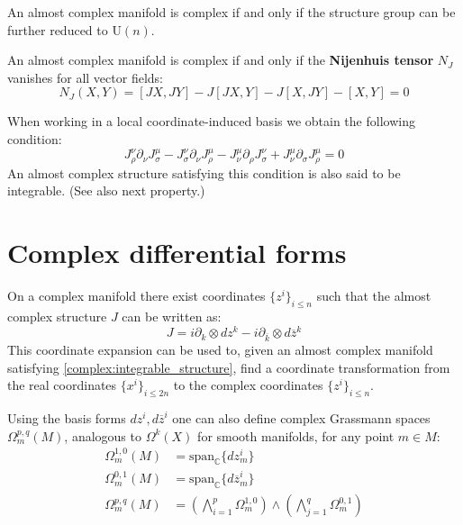 	\begin{property}
		An almost complex manifold is complex if and only if the structure group can be further reduced to U$(n)$.
	\end{property}
	
	\begin{theorem}
		An almost complex manifold is complex if and only if the \textbf{Nijenhuis tensor} $N_J$ vanishes for all vector fields:
		\begin{equation}
			\label{complex:integrable_structure}
			N_J(X, Y) = [JX, JY] - J[JX, Y] - J[X, JY] - [X, Y] = 0
		\end{equation}
	\end{theorem}
	When working in a local coordinate-induced basis we obtain the following condition:
	\begin{equation}
		J_\rho^\nu\partial_\nu J_\sigma^\mu - J_\sigma^\nu\partial_\nu J_\rho^\mu - J_\nu^\mu\partial_\rho J_\sigma^\nu + J_\nu^\mu\partial_\sigma J_\rho^\mu = 0
	\end{equation}
	An almost complex structure satisfying this condition is also said to be integrable. (See also next property.)
	
\section{Complex differential forms}
	
	\begin{property}
		On a complex manifold there exist coordinates $\{z^i\}_{i\leq n}$ such that the almost complex structure $J$ can be written as:
		\begin{equation}
			\label{complex:complex_structure}
			J = i\partial_k\otimes dz^k - i\partial_{\overline{k}}\otimes d\overline{z}^k
		\end{equation}
		This coordinate expansion can be used to, given an almost complex manifold satisfying \ref{complex:integrable_structure}, find a coordinate transformation from the real coordinates $\{x^i\}_{i\leq2n}$ to the complex coordinates $\{z^i\}_{i\leq n}$.
	\end{property}

	Using the basis forms $dz^i, d\overline{z}^i$ one can also define complex Grassmann spaces $\Omega^{p, q}_m(M)$, analogous to $\Omega^k(X)$ for smooth manifolds, for any point $m\in M$:
	\begin{align}
		\Omega^{1, 0}_m(M) &= \text{span}_{\mathbb{C}}\{dz^i_m\}\\
		\Omega^{0, 1}_m(M) &= \text{span}_{\mathbb{C}}\{d\overline{z}^i_m\}\\
		\Omega^{p, q}_m(M) &= \left(\bigwedge_{i=1}^p\Omega^{1, 0}_m\right)\wedge\left(\bigwedge_{j=1}^q\Omega^{0, 1}_m\right)
	\end{align}
	
